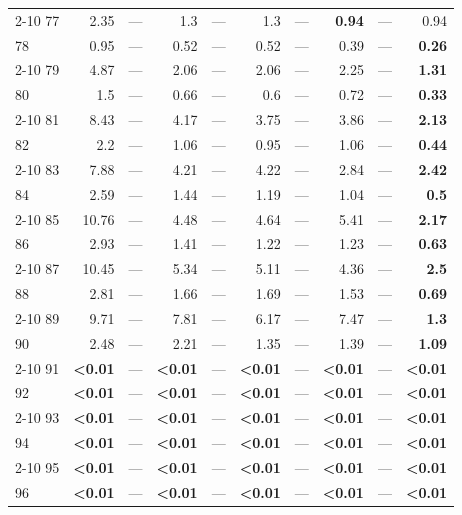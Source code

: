 \begin{longtable}{lr@{\hskip 4pt}l@{\hskip 12pt}r@{\hskip 4pt}l@{\hskip 12pt}r@{\hskip 4pt}l@{\hskip 12pt}r@{\hskip 4pt}l@{\hskip 12pt}r}
\cmidrule{2-10}
77 & 2.35 & --- & 1.3 & --- & 1.3 & --- & \textbf{0.94} & --- & 0.94 \\
78 & 0.95 & --- & 0.52 & --- & 0.52 & --- & 0.39 & --- & \textbf{0.26} \\
\cmidrule{2-10}
79 & 4.87 & --- & 2.06 & --- & 2.06 & --- & 2.25 & --- & \textbf{1.31} \\
80 & 1.5 & --- & 0.66 & --- & 0.6 & --- & 0.72 & --- & \textbf{0.33} \\
\cmidrule{2-10}
81 & 8.43 & --- & 4.17 & --- & 3.75 & --- & 3.86 & --- & \textbf{2.13} \\
82 & 2.2 & --- & 1.06 & --- & 0.95 & --- & 1.06 & --- & \textbf{0.44} \\
\cmidrule{2-10}
83 & 7.88 & --- & 4.21 & --- & 4.22 & --- & 2.84 & --- & \textbf{2.42} \\
84 & 2.59 & --- & 1.44 & --- & 1.19 & --- & 1.04 & --- & \textbf{0.5} \\
\cmidrule{2-10}
85 & 10.76 & --- & 4.48 & --- & 4.64 & --- & 5.41 & --- & \textbf{2.17} \\
86 & 2.93 & --- & 1.41 & --- & 1.22 & --- & 1.23 & --- & \textbf{0.63} \\
\cmidrule{2-10}
87 & 10.45 & --- & 5.34 & --- & 5.11 & --- & 4.36 & --- & \textbf{2.5} \\
88 & 2.81 & --- & 1.66 & --- & 1.69 & --- & 1.53 & --- & \textbf{0.69} \\
\cmidrule{2-10}
89 & 9.71 & --- & 7.81 & --- & 6.17 & --- & 7.47 & --- & \textbf{1.3} \\
90 & 2.48 & --- & 2.21 & --- & 1.35 & --- & 1.39 & --- & \textbf{1.09} \\
\cmidrule{2-10}
91 & \textbf{<0.01} & --- & \textbf{<0.01} & --- & \textbf{<0.01} & --- & \textbf{<0.01} & --- & \textbf{<0.01} \\
92 & \textbf{<0.01} & --- & \textbf{<0.01} & --- & \textbf{<0.01} & --- & \textbf{<0.01} & --- & \textbf{<0.01} \\
\cmidrule{2-10}
93 & \textbf{<0.01} & --- & \textbf{<0.01} & --- & \textbf{<0.01} & --- & \textbf{<0.01} & --- & \textbf{<0.01} \\
94 & \textbf{<0.01} & --- & \textbf{<0.01} & --- & \textbf{<0.01} & --- & \textbf{<0.01} & --- & \textbf{<0.01} \\
\cmidrule{2-10}
95 & \textbf{<0.01} & --- & \textbf{<0.01} & --- & \textbf{<0.01} & --- & \textbf{<0.01} & --- & \textbf{<0.01} \\
96 & \textbf{<0.01} & --- & \textbf{<0.01} & --- & \textbf{<0.01} & --- & \textbf{<0.01} & --- & \textbf{<0.01} \\

\end{longtable}

